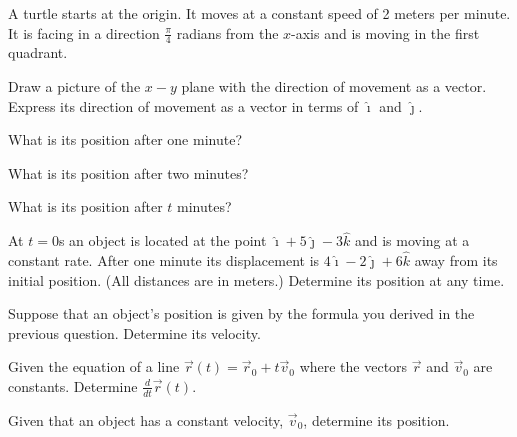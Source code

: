 \begin{problem}

  \item A turtle starts at the origin. It moves at a constant speed of 2
    meters per minute. It is facing in a direction $\frac{\pi}{4}$
    radians from the $x$-axis and is moving in the first
    quadrant.
    \begin{subproblem}
      \item Draw a picture of the $x-y$ plane with the direction of movement as a vector.
         Express its direction of movement as a vector in terms of $\hat{\imath}$ and $\hat{\jmath}$.
        \vfill
      \item What is its position after one minute?
        \vfill
      \item What is its position after two minutes?
        \vfill
      \item What is its position after $t$ minutes?
        \vfill
    \end{subproblem}
    \vfill

  \clearpage

  \item At $t=0$s an object is located at the point $\hat{\imath}+5\hat{\jmath}-3\hat{k}$  and is
  moving at a constant rate. After one minute its displacement is $4\hat{\imath}-2\hat{\jmath}+6\hat{k}$
  away from its initial position. (All distances are in meters.)
  Determine its position at any time.

    \vfill

  \item Suppose that an object's position is given by the formula you
    derived in the previous question. Determine its velocity.

  \vfill

  \clearpage

\item Given the equation of a line $\vec{r}(t)=\vec{r}_0 + t \vec{v}_0$ where the vectors $\vec{r}$ and $\vec{v}_0$ are constants. Determine $\frac{d}{dt}\vec{r}(t)$.
  \vfill

\item Given that an object has a constant velocity,  $\vec{v}_0$, determine its position.
  \vfill

\end{problem}


\postClass

